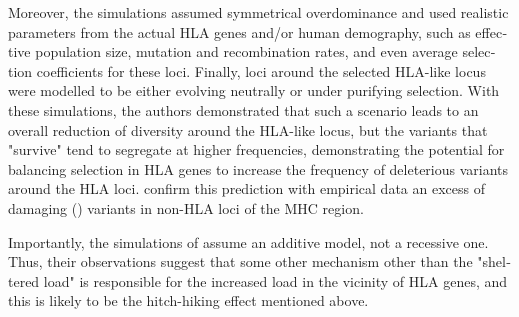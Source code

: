 \begin{refsection}
\begin{otherlanguage}{english}
Moreover, the simulations assumed symmetrical overdominance and used realistic parameters from the actual HLA genes and/or human demography, such as effective population size, mutation and recombination rates, and even average selection coefficients for these loci. Finally, loci around the selected HLA-like locus were modelled to be either evolving neutrally or under purifying selection. With these simulations, the authors demonstrated that such a scenario leads to an overall reduction of diversity around the HLA-like locus, but the variants that "survive" tend to segregate at higher frequencies, demonstrating the potential for balancing selection in HLA genes to increase the frequency of deleterious variants around the HLA loci. \textcite{Lenz2016} confirm this prediction with empirical data an excess of damaging (\cite{Adzhubei2010}) variants in non-HLA loci of the MHC region. 

Importantly, the simulations of \textcite{Lenz2016} assume an additive model, not a recessive one. Thus, their observations suggest that some other mechanism other than the "sheltered load" is responsible for the increased load in the vicinity of HLA genes, and this is likely to be the hitch-hiking effect mentioned above.  

\renewcommand*{\bibfont}{\footnotesize}
\renewcommand\bibname{References} 

\printbibliography[heading=bibintoc]   


\end{otherlanguage}
\end{refsection}
